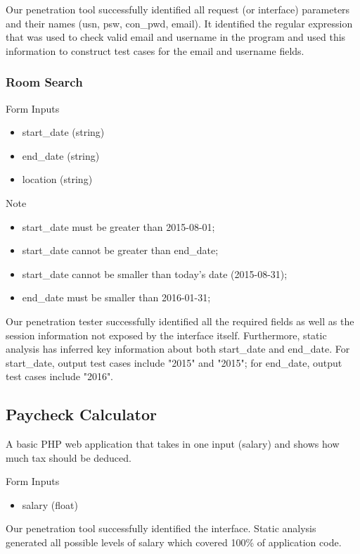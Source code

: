 Our penetration tool successfully identified all request (or interface) parameters and their names (usn, psw, con\_pwd, email). It identified the regular expression that was used to check valid email and username in the program and used this information to construct test cases for the email and username fields.

\subsubsection{Room Search}
Form Inputs
\begin{itemize}
  \item start\_date (string)
  \item end\_date (string)
  \item location (string)
\end{itemize}

Note
\begin{itemize}
\item start\_date must be greater than 2015-08-01;
\item start\_date cannot be greater than end\_date;
\item start\_date cannot be smaller than today’s date (2015-08-31);
\item end\_date must be smaller than 2016-01-31;
\end{itemize}

Our penetration tester successfully identified all the required fields as well as the session information not exposed by the interface itself. Furthermore, static analysis has inferred key information about both start\_date and end\_date. For start\_date, output test cases include "2015" and "2015"; for end\_date, output test cases include "2016". 

\subsection{Paycheck Calculator}
A basic PHP web application that takes in one input (salary) and shows how much tax should be deduced.

Form Inputs
\begin{itemize}
  \item salary (float)
\end{itemize}

Our penetration tool successfully identified the interface. Static analysis generated all possible levels of salary which covered 100\% of application code.




